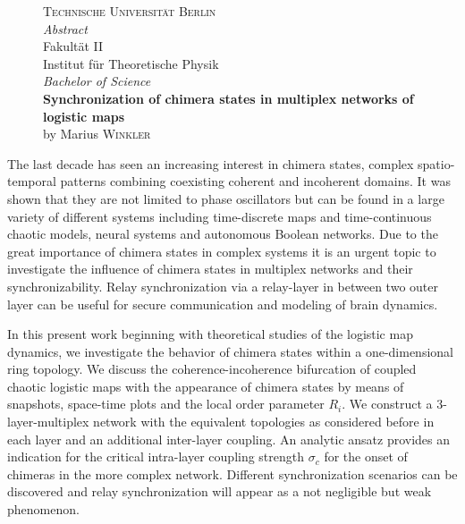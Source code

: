 
\begin{figure}
    \centering
    {\large \textsc{Technische Universität Berlin}}\\
    \vspace{0.5cm}
    {\huge \emph{Abstract}}\\
    \vspace{0.2cm}
    Fakultät II \\
    Institut für Theoretische Physik \\
    \vspace{0.3cm}
    \textit{Bachelor of Science}\\
    \vspace{0.3cm}
    \textbf{Synchronization of chimera states in multiplex networks of logistic maps}\\
    \vspace{0.2cm}
    by \textcolor{vaukgreen}{Marius \scshape{Winkler}}\\
\end{figure}
\noindent The last decade has seen an increasing interest in chimera states, complex spatio-temporal patterns combining coexisting coherent and incoherent domains. It was shown that they are not limited to phase oscillators but can be found in a large variety of different systems including time-discrete maps and time-continuous chaotic models, neural systems and autonomous Boolean networks. Due to the great importance of chimera states in complex systems it is an urgent topic to investigate the influence of chimera states in multiplex networks and their synchronizability. Relay synchronization via a relay-layer in between two outer layer can be useful for secure communication and modeling of brain dynamics.

In this present work beginning with theoretical studies of the logistic map dynamics, we investigate the behavior of chimera states within a one-dimensional ring topology. We discuss the coherence-incoherence bifurcation of coupled chaotic logistic maps with the appearance of chimera states by means of snapshots, space-time plots and the local order parameter $R_i$. We construct a 3-layer-multiplex network with the equivalent topologies as considered before in each layer and an additional inter-layer coupling. An analytic ansatz provides an indication for the critical intra-layer coupling strength $\sigma_c$ for the onset of chimeras in the more complex network. Different synchronization scenarios can be discovered and relay synchronization will appear as a not negligible but weak phenomenon. 

